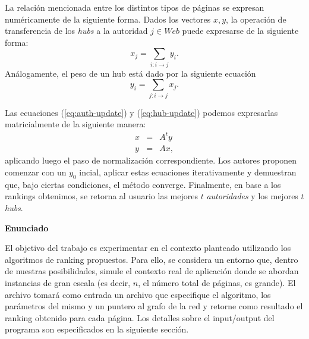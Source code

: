 La relaci\'on mencionada entre los distintos tipos de p\'aginas se expresan num\'ericamente de la siguiente forma. Dados los
vectores $x,y$, la operaci\'on de transferencia de los \emph{hubs} a la autoridad $j \in Web$ puede expresarse de la siguiente forma:
\begin{equation}
x_j = \sum_{i: i \to j} y_i. \label{eq:auth-update}
\end{equation}
An\'alogamente, el peso de un hub est\'a dado por la siguiente ecuaci\'on
\begin{equation}
y_i = \sum_{j: i \to j} x_j. \label{eq:hub-update}
\end{equation}

Las ecuaciones (\ref{eq:auth-update}) y (\ref{eq:hub-update}) podemos expresarlas matricialmente de la siguiente manera:
\begin{eqnarray}
x & = & A^ty \label{eq:auth-update-math} \\
y & = & Ax, \label{eq:hub-update-math} 
\end{eqnarray}
aplicando luego el paso de normalizaci\'on correspondiente. Los autores proponen comenzar con un $y_0$ incial, aplicar estas ecuaciones 
iterativamente y demuestran que, bajo ciertas condiciones, el m\'etodo converge. Finalmente, en base a los rankings obtenimos, se retorna
al usuario las mejores $t$ \emph{autoridades} y los mejores $t$ \emph{hubs}.

\vskip 5pt
\noindent\textbf{Enunciado}
\vskip 5pt

El objetivo del trabajo es experimentar en el contexto planteado utilizando los algoritmos de ranking propuestos. Para ello, se considera
un entorno que, dentro de nuestras posibilidades, simule el contexto real de aplicaci\'on donde se abordan instancias de gran escala (es
decir, $n$, el n\'umero total de p\'aginas, es grande). El archivo tomar\'a como entrada un archivo que especifique el algoritmo, los
par\'ametros del mismo y un puntero al grafo de la red y retorne como resultado el ranking obtenido para cada p\'agina. Los detalles sobre 
el input/output del programa son especificados en la siguiente secci\'on.

